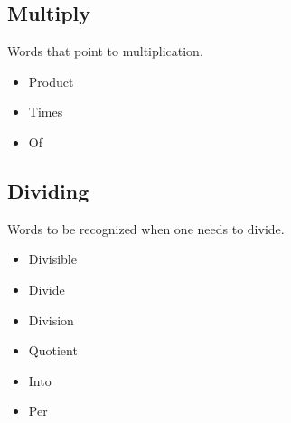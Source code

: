 \documentclass[]{article}
\begin{document}
\subsection{Multiply}
Words that point to multiplication. 
\begin{itemize}
	\item Product
	\item Times 
	\item Of	
\end{itemize}
\subsection{Dividing}
Words to be recognized when one needs to divide. 
\begin{itemize}
	\item Divisible
	\item Divide
	\item Division
	\item Quotient
	\item Into
	\item Per
\end{itemize}
\end{document}

